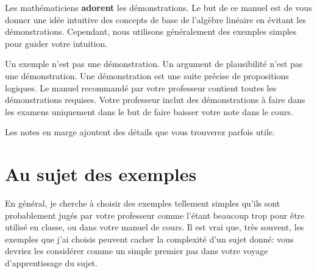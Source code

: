 Les mathématiciens \textbf{adorent} les démonstrations.
Le but de ce manuel est de vous donner une idée intuitive
des concepts de base de l'algèbre linéaire en évitant les démonstrations. Cependant, nous utilisons
généralement des exemples simples pour guider votre intuition.

\begin{NotProof}
Un exemple n'est pas une démonstration. Un argument de plausibilité n'est pas une démonstration. Une démonstration
est une suite précise de propositions logiques. Le manuel recommandé par votre professeur contient toutes les démonstrations requises.
Votre professeur inclut des démonstrations à faire dans les
examens uniquement dans le but de faire baisser votre note dans le cours.
\end{NotProof}

Les notes en marge ajoutent des
détails que vous trouverez parfois utile.

\section{Au sujet des exemples}

En général, je cherche à choisir des exemples tellement simples qu'ils sont probablement jugés par votre professeur comme l'étant beaucoup trop pour être utilisé en classe,
ou dans votre manuel de cours. Il est vrai que, très souvent,
les exemples que j'ai choisis peuvent cacher la complexité
d'un sujet donné: vous devriez les considérer comme un
simple premier pas dans votre voyage d'apprentissage du sujet.
